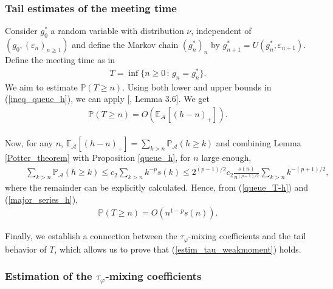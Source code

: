 \documentclass{ws-sd}
\newcommand{\E}{\mathbb{E}}
\newcommand{\Proba}{\mathbb{P}}
\newcommand\bigp[1]{\left(#1\right)}
\newcommand{\bigcro}[1]{\left[#1\right]}
\newcommand{\eps}{\varepsilon}
\begin{document}
\subsubsection{Tail estimates of the meeting time}

\noindent
Consider $g_0^*$ a random variable with distribution $\nu$, independent of $(g_0, (\eps_n)_{n \ge 1})$ and define the Markov chain $(g_n^*)_n$ by $g_{n+1}^* = U(g_n^*, \eps_{n+1})$. Define the meeting time as in \cite{5}
\begin{align}\label{def_T}
    T = \inf \{ n \ge 0 \, : \, g_n = g_n^*\}.
\end{align}
We aim to estimate $\Proba(T \ge n)$.
Using both lower and upper bounds in (\ref{ineq_queue_h}), we can apply [, Lemma 3.6]. We get
\begin{align}
        \label{queue_T-h}
    \Proba(T \ge n) = O\bigp{\E_{\mathcal A}\bigcro{(h - n)_+}}.
\end{align}
\\
Now, for any $n$,
$
    \E_{\mathcal A}\bigcro{(h - n)_+}
    = \sum_{k > n} \Proba_{\mathcal A}(h \ge k)
$
and combining Lemma \ref{Potter_theorem}
with Proposition \ref{queue_h}, for $n$ large enough,
\begin{align}
    &\hspace{15pt}\sum_{k>n}\Proba_{\mathcal{A}}(h \ge k )
    \le c_2\sum_{k>n}k^{-p}s(k)
    \le 2^{(p-1)/2}c_2 \frac{s(n)}{n^{(p-1)/2}}\sum_{k>n} k^{-(p+1)/2}, \label{major_series_h}
\end{align}
where the remainder can be explicitly calculated.
\noindent
Hence, from (\ref{queue_T-h}) and (\ref{major_series_h}),
\begin{align}\label{controle_queue_T}
    \Proba(T \ge n) = O(n^{1-p}s(n)).
\end{align}

Finally, we establish a connection between the $\tau_\varphi$-mixing coefficients and the tail behavior of $T$, which allows us to prove that (\ref{estim_tau_weakmoment}) holds.

\subsubsection{Estimation of the \texorpdfstring{$\tau_\varphi$}{}-mixing coefficients}
    \label{subsubsec:estim_tau}
\end{document}
